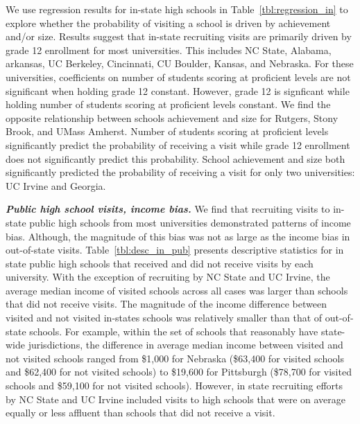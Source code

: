 \documentclass[twoside]{article}
\begin{document}
We use regression results for in-state high schools in Table~\ref{tbl:regression_in} to explore whether the probability of visiting a school is driven by achievement and/or size. Results suggest that in-state recruiting visits are primarily driven by grade 12 enrollment for most universities. This includes NC State, Alabama, arkansas, UC Berkeley, Cincinnati, CU Boulder, Kansas, and Nebraska. For these universities, coefficients on number of students scoring at proficient levels are not significant when holding grade 12 constant. However,  grade 12 is signficant while holding number of students scoring at proficient levels constant. We find the opposite relationship between schools achievement and size for Rutgers, Stony Brook, and UMass Amherst. Number of students scoring at proficient levels significantly predict the probability of receiving a visit while grade 12 enrollment does not significantly predict this probability. School achievement and size both significantly predicted the probability of receiving a visit for only two universities: UC Irvine and Georgia.

\textbf{\textit{Public high school visits, income bias.}} We find that recruiting visits to in-state public high schools from most universities demonstrated patterns of income bias. Although, the magnitude of this bias was not as large as the income bias in out-of-state visits. Table~\ref{tbl:desc_in_pub} presents descriptive statistics for in state public high schools that received and did not receive visits by each university.  With the exception of recruiting by NC State and UC Irvine, the average median income of visited schools across all cases was larger than schools that did not receive visits. The magnitude of the income difference between visited and not visited in-states schools was relatively smaller than that of out-of-state schools. For example, within the set of schools that reasonably have state-wide jurisdictions, the difference in average median income between visited and not visited schools ranged from \$1,000 for Nebraska (\$63,400 for visited schools and \$62,400 for not visited schools) to \$19,600 for Pittsburgh (\$78,700 for visited schools and \$59,100 for not visited schools). However, in state recruiting efforts by NC State and UC Irvine included visits to high schools that were on average equally or less affluent than schools that did not receive a visit.

\end{document}
